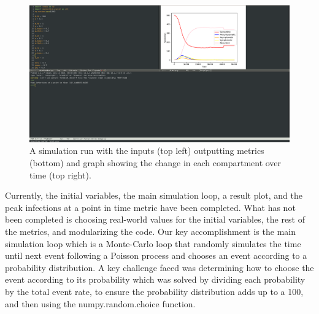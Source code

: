 \documentclass{article}
\begin{document}
\begin{figure}
  \includegraphics[scale=0.3]{running4.png}
  \caption{A simulation run with the inputs (top left) outputting metrics (bottom) and graph showing the change in each compartment over time (top right).}
\end{figure}

Currently, the initial variables, the main simulation loop, a result plot, and the peak infections at a point in time metric have been completed. What has not been completed is choosing real-world values for the initial variables, the rest of the metrics, and modularizing the code. Our key accomplishment is the main simulation loop which is a Monte-Carlo loop that randomly simulates the time until next event following a Poisson process and chooses an event according to a probability distribution. A key challenge faced was determining how to choose the event according to its probability which was solved by dividing each probability by the total event rate, to ensure the probability distribution adds up to a 100, and then using the numpy.random.choice function.
\end{document}
